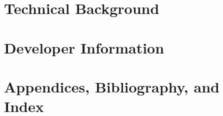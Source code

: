 \documentclass[letterpaper,10pt,titlepage]{custbook}
\begin{document}
























\part{Technical Background}





\part{Developer Information}




%

\part{Appendices, Bibliography, and Index}

\appendix


%

%
\cleardoublepage
{}

%
\cleardoublepage
{}
\printindex
%
\end{document}

